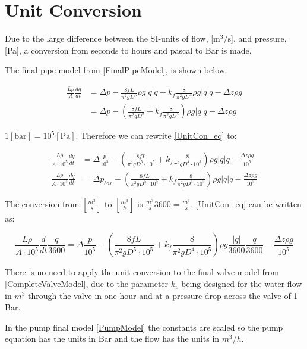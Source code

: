 \chapter{Unit Conversion}
\label{unitCON}

Due to the large difference between the SI-units of flow, [$\text{m}^3/\text{s}$], and pressure, [Pa], a conversion from seconds to hours and pascal to Bar is made.

The final pipe model from \eqref{FinalPipeModel}, is shown below.   

\begin{equation}
\begin{split}
   \frac{L \rho}{A} \frac{dq}{dt} &=\Delta p - \frac{8fL}{\pi^{2}gD^5} \rho g  |q| q - k_f \frac{8}{\pi^2gD^4} \rho g |q| q - \Delta z \rho g \\
   &=\Delta p - (\frac{8fL}{\pi^{2}gD^5} + k_f \frac{8}{\pi^2gD^4}) \rho g |q| q - \Delta z \rho g
\end{split}
\label{UnitCon_eq}
\end{equation}

$1 [\text{bar}] = 10^5[\text{Pa}]$. Therefore we can rewrite \eqref{UnitCon_eq} to: 

\begin{equation}
\begin{split}
   \frac{L \rho}{A\cdot10^5} \frac{dq}{dt} &= \Delta \frac{p}{10^5} - (\frac{8fL}{\pi^{2}gD^5\cdot10^5} + k_f \frac{8}{\pi^2gD^4\cdot10^5}) \rho g |q| q - \frac{\Delta z \rho g}{10^5}\\
   \frac{L \rho}{A\cdot10^5} \frac{dq}{dt} &= \Delta p_{bar} - (\frac{8fL}{\pi^{2}gD^5\cdot10^5} + k_f \frac{8}{\pi^2gD^4\cdot10^5}) \rho g |q| q - \frac{\Delta z \rho g}{10^5}
\end{split}
\end{equation}

The conversion from $[\frac{m^3}{s}]$ to $[\frac{m^3}{h}]$ is $\frac{m^3}{s} 3600 = \frac{m^3}{s}$. \eqref{UnitCon_eq} can be written as:

\begin{equation}
   \frac{L \rho}{A\cdot10^5} \frac{d}{dt}\frac{q}{3600} = \Delta \frac{p}{10^5} - (\frac{8fL}{\pi^{2}gD^5\cdot10^5} + k_f \frac{8}{\pi^2gD^4\cdot10^5}) \rho g \frac{|q|}{3600} \frac{q}{3600} - \frac{\Delta z \rho g}{10^5}
\end{equation}

There is no need to apply the unit conversion to the final valve model from \eqref{CompleteValveModel}, due to the parameter $k_v$ being designed for the water flow in $m^3$
through the  valve in one hour and at a pressure drop across the valve of 1 Bar. 

In the pump final model \eqref{PumpModel} the constants are scaled so the pump equation has the units in Bar and the flow has the units in $m^3/h$.